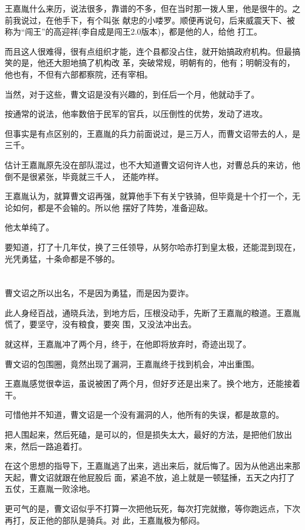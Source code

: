 \documentclass[11pt,a4paper,onecolumn]{article}
\begin{document}
王嘉胤什么来历，说法很多，靠谱的不多，但在当时那一拨人里，他是很牛的。之前我说过，在他手下，有个叫张
献忠的小喽罗。顺便再说句，后来威震天下、被称为``闯王''的高迎祥(李自成是闯王2.0版本)，都是他的人，给他
打工。

而且这人很难得，很有点组织才能，连个县都没占住，就开始搞政府机构。但最搞笑的是，他还大胆地搞了机构改
革，突破常规，明朝有的，他有；明朝没有的，他也有，不但有六部都察院，还有宰相。

当然，对于这些，曹文诏是没有兴趣的，到任后一个月，他就动手了。

按通常的说法，他率数倍于民军的官兵，以压倒性的优势，发动了进攻。

但事实是有点区别的，王嘉胤的兵力前面说过，是三万人，而曹文诏带去的人，是三千。

估计王嘉胤原先没在部队混过，也不大知道曹文诏何许人也，对曹总兵的来访，他倒不是很紧张，毕竟就三千人，
还能咋样。

王嘉胤认为，就算曹文诏再强，就算他手下有关宁铁骑，但毕竟是十个打一个，无论如何，都是不会输的。所以他
摆好了阵势，准备迎敌。

他太单纯了。

要知道，打了十几年仗，换了三任领导，从努尔哈赤打到皇太极，还能混到现在，光凭勇猛，十条命都是不够的。

\section[\thesection]{}

曹文诏之所以出名，不是因为勇猛，而是因为耍诈。

此人身经百战，通晓兵法，到地方后，压根没动手，先断了王嘉胤的粮道。王嘉胤慌了，要坚守，没有粮食，要突
围，又没法冲出去。

就这样，王嘉胤冲了两个月，终于，在他即将放弃时，奇迹出现了。

曹文诏的包围圈，竟然出现了漏洞，王嘉胤终于找到机会，冲出重围。

王嘉胤感觉很幸运，虽说被困了两个月，但好歹还是出来了。换个地方，还能接着干。

可惜他并不知道，曹文诏是一个没有漏洞的人，他所有的失误，都是故意的。

把人围起来，然后死磕，是可以的，但是损失太大，最好的方法，是把他们放出来，然后一路追着打。

在这个思想的指导下，王嘉胤逃了出来，逃出来后，就后悔了。因为从他逃出来那天起，曹文诏就跟在他屁股后
面，紧追不放，追上就是一顿猛捶，五天之内打了五仗，王嘉胤一败涂地。

更可气的是，曹文诏似乎不打算一次把他玩死，每次打完就撤，等你跑远点，下次再打，反正他的部队是骑兵。对
此，王嘉胤极为郁闷。
\end{document}
